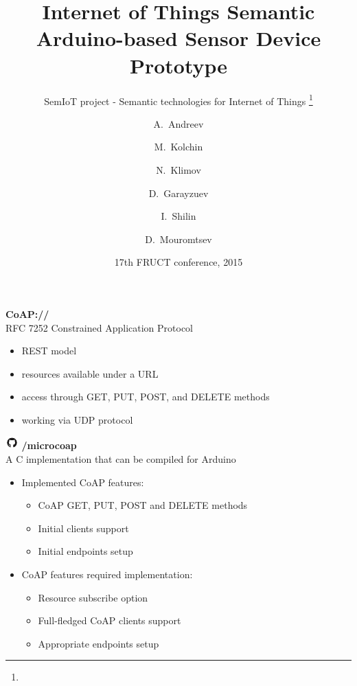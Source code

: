 \documentclass{beamer}
\title{Internet of Things Semantic Arduino-based Sensor Device Prototype}
\subtitle{
    SemIoT project - Semantic technologies for Internet of Things
    \footnote{\semioturl}
}
\author{
    A.~Andreev
    \and
    M.~Kolchin
    \and
    N.~Klimov
    \and
    D.~Garayzuev
    \and
    I.~Shilin
    \and
    D.~Mouromtsev
}
\institute[NRU ITMO] %
{
    ITMO University, St.Petersburg, Russia
}
\date{17th FRUCT conference, 2015}
\begin{document}
    \begin{frame}
        \titlepage
    \end{frame}

    \begin{frame}
        \begin{center}
            \begin{multicols}{2}
                \huge{\textbf{CoAP://}}\\
                \large{RFC 7252 Constrained Application Protocol}
            \end{multicols}
        \end{center}
        \begin{itemize}
            \item REST model
            \item resources available under a URL
            \item access through GET, PUT, POST, and DELETE methods
            \item working via UDP protocol
        \end{itemize}
    \end{frame}

    \begin{frame}
        \begin{multicols}{2}
            \includegraphics[height=0.5cm,keepaspectratio]{github}
            \huge{\textbf{/microcoap}}\\
            \large{A C implementation that can be compiled for Arduino}
        \end{multicols}
        \begin{itemize}
            \item Implemented CoAP features:
                \begin{itemize}
                    \item CoAP GET, PUT, POST and DELETE methods
                    \item Initial clients support
                    \item Initial endpoints setup
                \end{itemize}
            \item CoAP features required implementation:
                \begin{itemize}
                    \item Resource subscribe option
                    \item Full-fledged CoAP clients support
                    \item Appropriate endpoints setup
                \end{itemize}
        \end{itemize}
    \end{frame}
    
\end{document}

